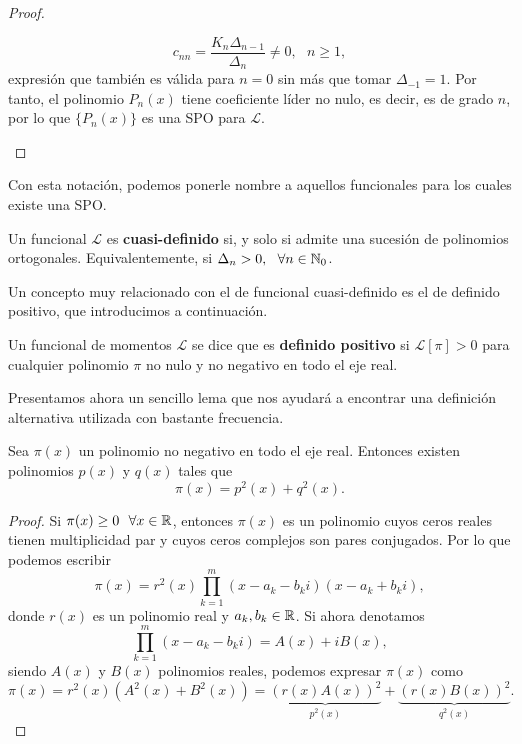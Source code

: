\begin{proof}
\begin{itemize}
        \begin{equation}
            \label{eq:cnn}
            c_{nn} = \dfrac{K_n \Delta_{n-1}}{\Delta_n} \neq 0, \ \ \ n\geq 1,
        \end{equation}
        expresión que también es válida para $n=0$ sin más que tomar $\Delta_{-1}=1$. Por tanto, el polinomio $P_n(x)$ tiene coeficiente líder no nulo, es decir, es de grado $n$, por lo que $\{P_n(x)\}$ es una SPO para $\mathcal L$. 
    \end{itemize}

\end{proof}

Con esta notación, podemos ponerle nombre a aquellos funcionales para los cuales existe una SPO.

\begin{definicion}
    Un funcional $\mathcal L$ es \textbf{cuasi-definido} si, y solo si admite una sucesión de polinomios ortogonales. Equivalentemente, si $\Delta_n > 0, \ \ \forall n\in \mathbb{N}_0$.
    
\end{definicion}

Un concepto muy relacionado con el de funcional cuasi-definido es el de definido positivo, que introducimos a continuación.

\begin{definicion}
    \label{def:func-def-pos}

    Un funcional de momentos $\mathcal{L}$ se dice que es \textbf{definido positivo} si $\mathcal{L}[\pi] > 0$ para cualquier polinomio $\pi$ no nulo y no negativo en todo el eje real.
    
\end{definicion}

Presentamos ahora un sencillo lema que nos ayudará a encontrar una definición alternativa utilizada con bastante frecuencia. 

\begin{lema}
Sea $\pi(x)$ un polinomio no negativo en todo el eje real. Entonces existen polinomios $p(x)$ y $q(x)$ tales que 
$$
\pi(x) = p^2(x) + q^2(x).
$$
\end{lema}
\begin{proof}
    Si $\pi(x) \geq 0 \ \ \forall x\in\R$, entonces $\pi(x)$ es un polinomio cuyos ceros reales tienen multiplicidad par y cuyos ceros complejos son pares conjugados. Por lo que podemos escribir
    $$
    \pi(x) = r^2(x) \prod_{k=1}^m(x-a_k-b_k i)(x-a_k+b_k i),
    $$
    donde $r(x)$ es un polinomio real y $a_k,b_k\in\mathbb{R}$. Si ahora denotamos
    $$
    \prod_{k=1}^m(x-a_k-b_k i) = A(x) + i B(x),
    $$
    siendo $A(x)$ y $B(x)$ polinomios reales, podemos expresar $\pi(x)$ como
    $$
    \pi(x) = r^2(x)(A^2(x) + B^2(x)) = \underbrace{(r(x)A(x))^2}_{p^2(x)} + \underbrace{(r(x)B(x))^2}_{q^2(x)}.
    $$
\end{proof}

